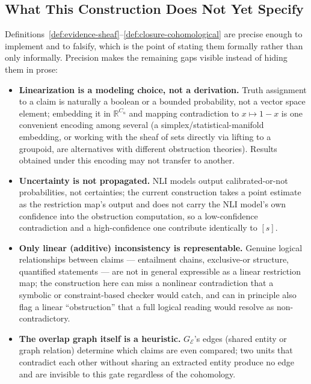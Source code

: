 \subsection{What This Construction Does Not Yet Specify}
\label{sec:retrieval:sheaf-gaps}

Definitions~\ref{def:evidence-sheaf}--\ref{def:closure-cohomological} are precise enough to implement and to falsify, which is the point of stating them formally rather than only informally. Precision makes the remaining gaps visible instead of hiding them in prose:

\begin{itemize}
  \item \textbf{Linearization is a modeling choice, not a derivation.} Truth assignment to a claim is naturally a boolean or a bounded probability, not a vector space element; embedding it in $\mathbb{R}^{C_u}$ and mapping contradiction to $x \mapsto 1-x$ is one convenient encoding among several (a simplex/statistical-manifold embedding, or working with the sheaf of sets directly via lifting to a groupoid, are alternatives with different obstruction theories). Results obtained under this encoding may not transfer to another.
  \item \textbf{Uncertainty is not propagated.} NLI models output calibrated-or-not probabilities, not certainties; the current construction takes a point estimate as the restriction map's output and does not carry the NLI model's own confidence into the obstruction computation, so a low-confidence contradiction and a high-confidence one contribute identically to $[s]$.
  \item \textbf{Only linear (additive) inconsistency is representable.} Genuine logical relationships between claims --- entailment chains, exclusive-or structure, quantified statements --- are not in general expressible as a linear restriction map; the construction here can miss a nonlinear contradiction that a symbolic or constraint-based checker would catch, and can in principle also flag a linear ``obstruction'' that a full logical reading would resolve as non-contradictory.
  \item \textbf{The overlap graph itself is a heuristic.} $G_{\mathcal{E}}$'s edges (shared entity or graph relation) determine which claims are even compared; two units that contradict each other without sharing an extracted entity produce no edge and are invisible to this gate regardless of the cohomology.
\end{itemize}

